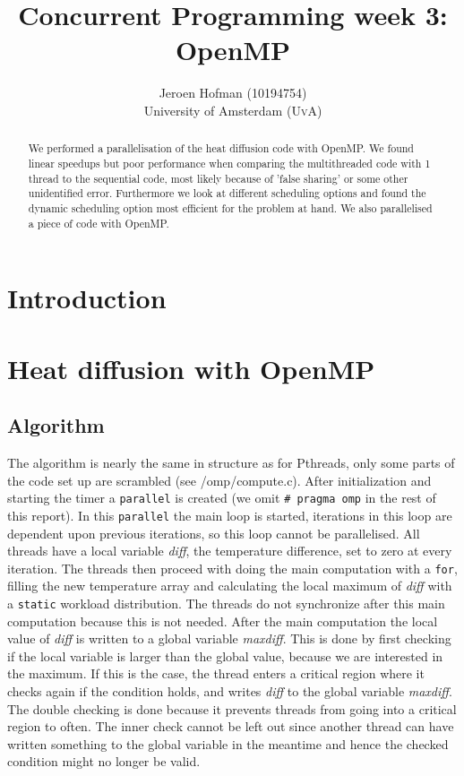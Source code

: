 \documentclass[11pt,a4paper,onecolumn]{article}
\author{Jeroen Hofman (10194754) \\
[15pt] University of Amsterdam (\textsc{UvA})}
\title{Concurrent Programming week 3:\\
  OpenMP
		}
\begin{document}
\maketitle
\captionsetup{width=0.8\textwidth}
\thispagestyle{empty}

\begin{center}
\begin{abstract}
\small{We performed a parallelisation of the heat diffusion code with OpenMP. We found linear speedups but poor performance when comparing the multithreaded code with 1 thread to the sequential code, most likely because of 'false sharing' or some other unidentified error. Furthermore we look at different scheduling options and found the dynamic scheduling option most efficient for the problem at hand. We also parallelised a piece of code with OpenMP.}
\end{abstract}
\end{center}

\newpage
\tableofcontents
\newpage

\section{Introduction}

\section{Heat diffusion with OpenMP}
\subsection{Algorithm}
The algorithm is nearly the same in structure as for Pthreads, only some parts of the code set up are scrambled (see /omp/compute.c). After initialization and starting the timer a \texttt{parallel} is created (we omit \texttt{\# pragma omp} in the rest of this report). In this \texttt{parallel} the main loop is started, iterations in this loop are dependent upon previous iterations, so this loop cannot be parallelised. All threads have a local variable \emph{diff}, the temperature difference, set to zero at every iteration. The threads then proceed with doing the main computation with a \texttt{for}, filling the new temperature array and calculating the local maximum of \emph{diff} with a \texttt{static} workload distribution. The threads do not synchronize after this main computation because this is not needed. After the main computation the local value of \emph{diff} is written to a global variable \emph{maxdiff}. This is done by first checking if the local variable is larger than the global value, because we are interested in the maximum. If this is the case, the thread enters a critical region where it checks again if the condition holds, and writes \emph{diff} to the global variable \emph{maxdiff}. The double checking is done because it prevents threads from going into a critical region to often. The inner check cannot be left out since another thread can have written something to the global variable in the meantime and hence the checked condition might no longer be valid.
\end{document}
